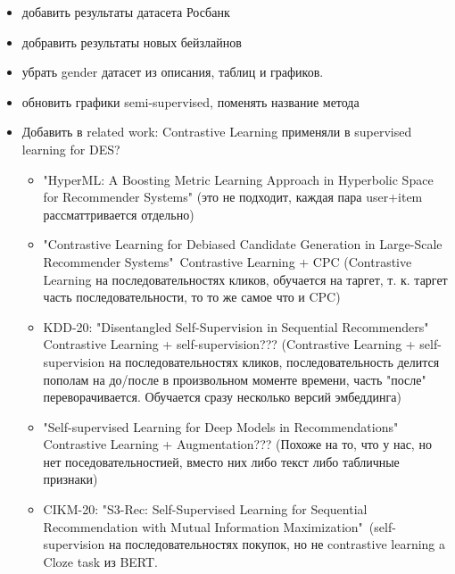 \documentclass{article}
\begin{document}
\begin{itemize}
\item добавить результаты датасета Росбанк

\item добравить результаты новых бейзлайнов

\item убрать gender датасет из описания, таблиц и графиков.

\item обновить графики semi-supervised, поменять название метода

\item Добавить в related work: Contrastive Learning применяли в supervised learning for DES?
\begin{itemize}
\item "HyperML: A Boosting Metric Learning Approach in Hyperbolic Space for Recommender Systems" (это не подходит, каждая пара user+item рассматтривается отдельно)
\item "Contrastive Learning for Debiased Candidate Generation in Large-Scale Recommender Systems"\ Contrastive Learning + CPC (Contrastive Learning на последовательностях кликов, обучается на таргет, т. к. таргет часть последовательности, то то же самое что и CPC)
\item KDD-20: "Disentangled Self-Supervision in Sequential Recommenders" Contrastive Learning + self-supervision??? (Contrastive Learning + self-supervision на последовательностях кликов, последовательность делится пополам на до/после в произвольном моменте времени, часть "после" переворачивается. Обучается сразу несколько версий эмбеддинга)
\item "Self-supervised Learning for Deep Models in Recommendations" Contrastive Learning + Augmentation??? (Похоже на то, что у нас, но нет поседовательностией, вместо них либо текст либо табличные признаки)
\item CIKM-20: "S3-Rec: Self-Supervised Learning for Sequential Recommendation with Mutual Information Maximization"\ (self-supervision на последовательностях покупок, но не contrastive learning a  Cloze task из BERT.
\end{itemize}

\end{itemize}
\end{document}
